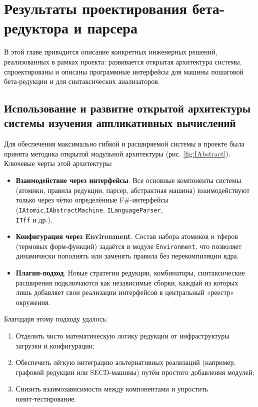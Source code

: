 \chapter{Результаты проектирования бета-редуктора и парсера}
\label{chapter3}

В этой главе приводится описание конкретных инженерных решений, реализованных в рамках проекта: развивается открытая архитектура системы, спроектированы и описаны программные интерфейсы для машины пошаговой бета‑редукции и для синтаксических анализаторов.

\section{Использование и развитие открытой архитектуры системы изучения аппликативных вычислений}
\label{sec:open-architecture}

Для обеспечения максимально гибкой и расширяемой системы в проекте была принята методика открытой модульной архитектуры (рис. \ref{fig:IAbstract}).  
Ключевые черты этой архитектуры:
\begin{itemize}
  \item \textbf{Взаимодействие через интерфейсы}. Все основные компоненты системы (атомики, правила редукции, парсер, абстрактная машина) взаимодействуют только через чётко определённые F\#-интерфейсы (\texttt{IAtomic},\texttt{IAbstractMachine}, \texttt{ILanguageParser},\\\texttt{ITff}  и др.).
  \item \textbf{Конфигурация через Environment}. Состав набора атомиков и тферов (термовых форм-функций) задаётся в модуле \texttt{Environment}, что позволяет динамически пополнять или заменять правила без перекомпиляции ядра.
  \item \textbf{Плагин-подход}. Новые стратегии редукции, комбинаторы, синтаксические расширения подключаются как независимые сборки, каждый из которых лишь добавляет свои реализации интерфейсов в центральный «реестр» окружения.
\end{itemize}

Благодаря этому подходу удалось:
\begin{enumerate}
  \item Отделить чисто математическую логику редукции от инфраструктуры загрузки и конфигурации;
  \item Обеспечить лёгкую интеграцию альтернативных реализаций (например, графовой редукции или SECD‑машины) путём простого добавления модулей;
  \item Снизить взаимозависимости между компонентами и упростить юнит‑тестирование.
\end{enumerate}


